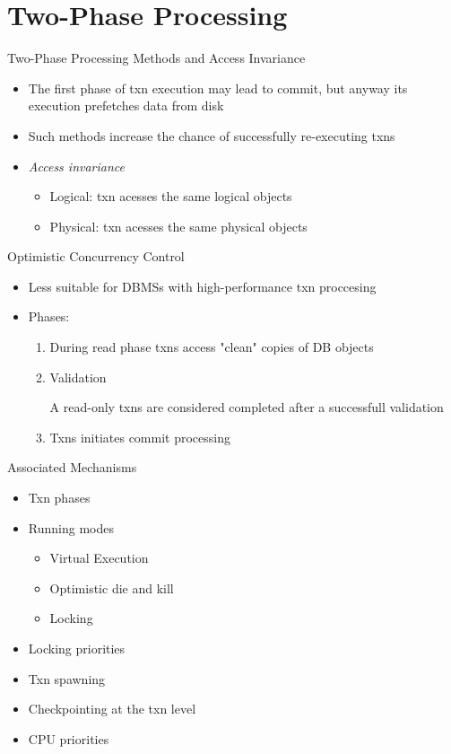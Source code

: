 \documentclass[sans]{beamer}
\begin{document}
\section{Two-Phase Processing}

\begin{frame}{Two-Phase Processing Methods and Access Invariance}
  \begin{itemize}
    \item The first phase of txn execution may lead to commit,
      but anyway its execution prefetches data from disk 
    \item Such methods increase the chance of successfully re-executing
      txns
    \item \emph{Access invariance}
      \begin{itemize}
        \item Logical: txn acesses the same logical objects
        \item Physical: txn acesses the same physical objects
      \end{itemize}
  \end{itemize}
\end{frame}

\begin{frame}{Optimistic Concurrency Control}
  \begin{itemize}
    \item Less suitable for DBMSs with high-performance txn proccesing
    \item Phases:
      \begin{enumerate}
        \item During read phase txns access "clean" copies of DB objects
        \item Validation

         A read-only txns are considered completed after a
          successfull validation
        \item Txns initiates commit processing
      \end{enumerate}
  \end{itemize}
\end{frame}

\begin{frame}{Associated Mechanisms}
  \begin{itemize}
    \item Txn phases
    \item Running modes
      \begin{itemize}
        \item Virtual Execution
        \item Optimistic die and kill
        \item Locking
      \end{itemize}
    \item Locking priorities
    \item Txn spawning
    \item Checkpointing at the txn level
    \item CPU priorities
  \end{itemize}
\end{frame}
\end{document}
